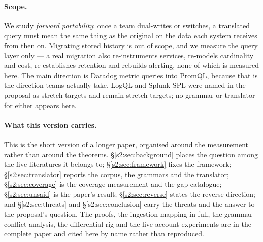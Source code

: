 \paragraph{Scope.}
We study \emph{forward portability}: once a team dual-writes or switches, a translated
query must mean the same thing as the original on the data each system receives from then
on. Migrating stored history is out of scope, and we measure the query layer only --- a
real migration also re-instruments services, re-models cardinality and cost, re-establishes
retention and rebuilds alerting, none of which is measured here. The main direction is
Datadog metric queries into PromQL, because that is the direction teams actually take.
LogQL and Splunk SPL were named in the proposal as stretch targets and remain stretch
targets; no grammar or translator for either appears here.

\paragraph{What this version carries.}
This is the short version of a longer paper, organised around the measurement rather than
around the theorems. \S\ref{s2:sec:background} places the question among the five
literatures it belongs to; \S\ref{s2:sec:framework} fixes the framework;
\S\ref{s2:sec:translator} reports the corpus, the grammars and the translator;
\S\ref{s2:sec:coverage} is the coverage measurement and the gap catalogue;
\S\ref{s2:sec:unsaid} is the paper's result; \S\ref{s2:sec:reverse} states the reverse
direction; and \S\ref{s2:sec:threats} and \S\ref{s2:sec:conclusion} carry the threats and
the answer to the proposal's question. The proofs, the ingestion mapping in full, the
grammar conflict analysis, the differential rig and the live-account experiments are in the
complete paper and cited here by name rather than reproduced.

